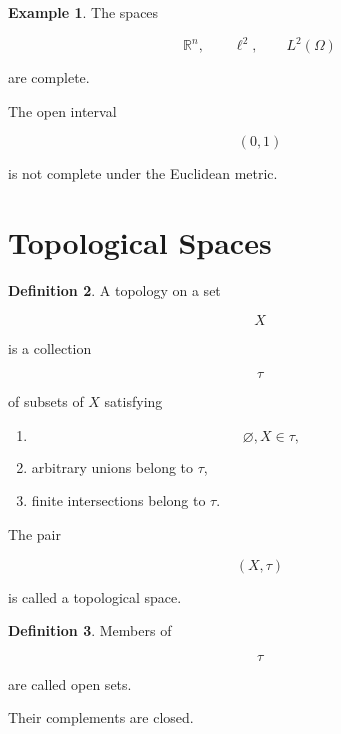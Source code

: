 \documentclass[11pt]{book}
\numberwithin{equation}{chapter}
\theoremstyle{definition}
\newtheorem{definition}{Definition}[chapter]
\newtheorem{example}[definition]{Example}
\theoremstyle{plain}
\begin{document}

\begin{example}

The spaces

\[
\mathbb R^n,
\qquad
\ell^2,
\qquad
L^2(\Omega)
\]

are complete.

The open interval

\[
(0,1)
\]

is not complete under the Euclidean metric.

\end{example}


\section{Topological Spaces}

\begin{definition}

A topology on a set

\[
X
\]

is a collection

\[
\tau
\]

of subsets of \(X\) satisfying

\begin{enumerate}

\item
\[
\varnothing,
X
\in\tau,
\]

\item
arbitrary unions belong to \(\tau\),

\item
finite intersections belong to \(\tau\).

\end{enumerate}

The pair

\[
(X,\tau)
\]

is called a topological space.

\end{definition}


\begin{definition}

Members of

\[
\tau
\]

are called open sets.

Their complements are closed.

\end{definition}
\end{document}
